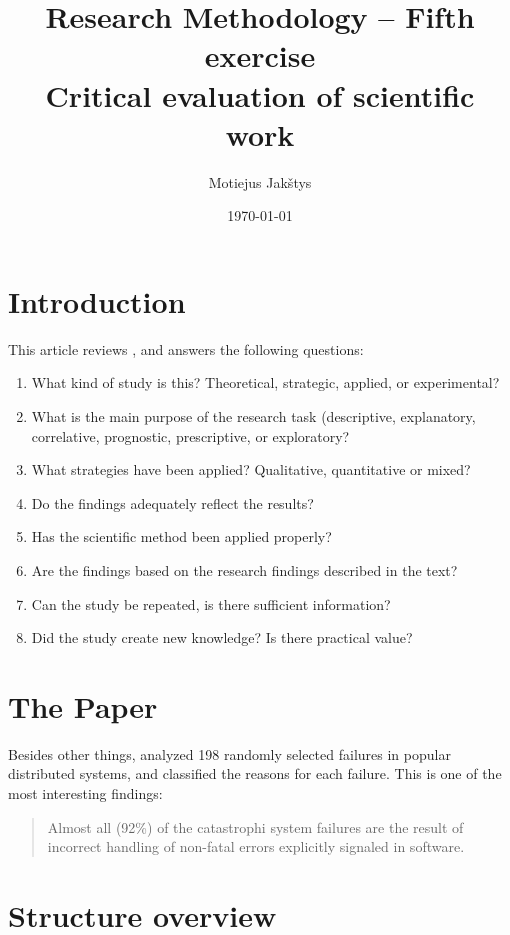 \documentclass{article}
\title{
    Research Methodology -- Fifth exercise\\ \vspace{4mm}
    Critical evaluation of scientific work
}
\author{Motiejus Jakštys}
\date{\today}
\begin{document}
\maketitle

\section{Introduction}

This article reviews \cite{186171}, and answers the following questions:

\begin{enumerate}
    \item What kind of study is this? Theoretical, strategic, applied, or
        experimental?
    \item What is the main purpose of the research task (descriptive,
        explanatory, correlative, prognostic, prescriptive, or exploratory?
    \item What strategies have been applied? Qualitative, quantitative or
        mixed?
    \item Do the findings adequately reflect the results?
    \item Has the scientific method been applied properly?
    \item Are the findings based on the research findings described in the
        text?
    \item Can the study be repeated, is there sufficient information?
    \item Did the study create new knowledge? Is there practical value?
\end{enumerate}

\section{The Paper}

Besides other things, \cite{186171} analyzed 198 randomly selected failures in
popular distributed systems, and classified the reasons for each failure. This
is one of the most interesting findings:

\blockquote[\cite{186171}] {
    Almost all (92\%) of the catastrophi system failures are the result of
    incorrect handling of non-fatal errors explicitly signaled in software.
}

\section{Structure overview}
\end{document}
